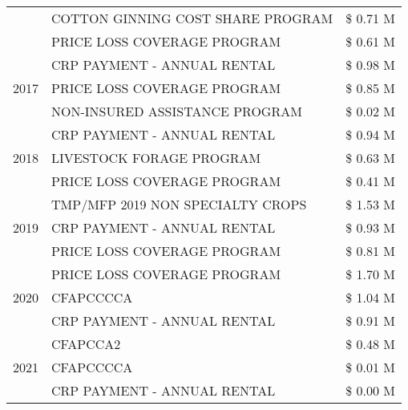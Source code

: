 \begin{tabular}{llr}
 & COTTON GINNING COST SHARE PROGRAM & \$ 0.71 M \\
 & PRICE LOSS COVERAGE PROGRAM & \$ 0.61 M \\
\cline{1-3}
\multirow[t]{3}{*}{2017} & CRP PAYMENT - ANNUAL RENTAL & \$ 0.98 M \\
 & PRICE LOSS COVERAGE PROGRAM & \$ 0.85 M \\
 & NON-INSURED ASSISTANCE PROGRAM & \$ 0.02 M \\
\cline{1-3}
\multirow[t]{3}{*}{2018} & CRP PAYMENT - ANNUAL RENTAL & \$ 0.94 M \\
 & LIVESTOCK FORAGE PROGRAM & \$ 0.63 M \\
 & PRICE LOSS COVERAGE PROGRAM & \$ 0.41 M \\
\cline{1-3}
\multirow[t]{3}{*}{2019} & TMP/MFP 2019 NON SPECIALTY CROPS & \$ 1.53 M \\
 & CRP PAYMENT - ANNUAL RENTAL & \$ 0.93 M \\
 & PRICE LOSS COVERAGE PROGRAM & \$ 0.81 M \\
\cline{1-3}
\multirow[t]{3}{*}{2020} & PRICE LOSS COVERAGE PROGRAM & \$ 1.70 M \\
 & CFAPCCCCA & \$ 1.04 M \\
 & CRP PAYMENT - ANNUAL RENTAL & \$ 0.91 M \\
\cline{1-3}
\multirow[t]{3}{*}{2021} & CFAPCCA2 & \$ 0.48 M \\
 & CFAPCCCCA & \$ 0.01 M \\
 & CRP PAYMENT - ANNUAL RENTAL & \$ 0.00 M \\
\cline{1-3}
\bottomrule
\end{tabular}
